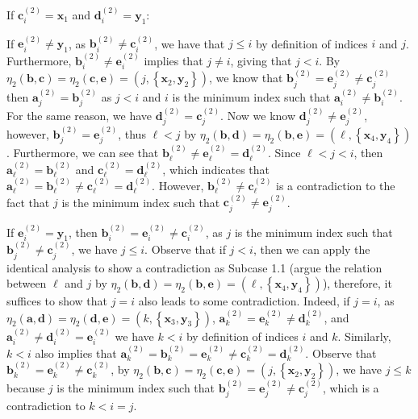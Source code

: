 \documentclass[11pt]{article}
\theoremstyle{definition}
\newcommand{\aaa}{\boldsymbol{a}}
\newcommand{\bb}{\boldsymbol{b}}
\newcommand{\cc}{\boldsymbol{c}}
\newcommand{\dd}{\boldsymbol{d}}
\newcommand{\ee}{\boldsymbol{e}}
\begin{document}
\begin{Case}
    \item If $\cc_{i}^{(2)}=\boldsymbol{x}_{1}$ and $\dd_{i}^{(2)}=\boldsymbol{y}_{1}$:  
    \begin{Case}
        \item If $\ee_{i}^{(2)}\neq \boldsymbol{y}_{1}$, as $\bb_{i}^{(2)}\neq \cc_{i}^{(2)}$, we have that $j\le i$ by definition of indices $i$ and $j$. Furthermore, $\bb_{i}^{(2)}\neq \ee_{i}^{(2)}$ implies that $j\neq i$, giving that $j<i$. By $\eta_{2}(\bb,\cc)=\eta_{2}(\cc,\ee)=(j,\left\{\boldsymbol{x}_{2},\boldsymbol{y}_{2}\right\})$, we know that $\bb_{j}^{(2)}=\ee_{j}^{(2)}\neq\cc_{j}^{(2)}$ then $\boldsymbol{a}_{j}^{(2)}=\bb_{j}^{(2)}$ as $j<i$ and $i$ is the minimum index such that $\boldsymbol{a}_{i}^{(2)}\neq\bb_{i}^{(2)}$. For the same reason, we have $\dd_{j}^{(2)}=\boldsymbol{c}_{j}^{(2)}$. Now we know $\dd_{j}^{(2)}\neq\ee_{j}^{(2)}$, however, $\bb_{j}^{(2)}=\ee_{j}^{(2)}$, thus $\ell<j$ by $\eta_{2}(\bb,\dd)=\eta_{2}(\bb,\ee)=(\ell,\left\{\boldsymbol{x}_{4},\boldsymbol{y}_{4}\right\})$. Furthermore,  we can see that $\bb_{\ell}^{(2)}\neq \ee_{\ell}^{(2)}=\dd_{\ell}^{(2)}$. Since $\ell<j<i$, then $\aaa_{\ell}^{(2)}=\bb_{\ell}^{(2)}$ and $\boldsymbol{c}_{\ell}^{(2)}=\dd_{\ell}^{(2)}$, which indicates that $\aaa_{\ell}^{(2)}=\bb_{\ell}^{(2)}\neq\boldsymbol{c}_{\ell}^{(2)}=\dd_{\ell}^{(2)}$. However, $\bb_{\ell}^{(2)}\neq\cc_{\ell}^{(2)}$ is a contradiction to the fact that $j$ is the minimum index such that $\boldsymbol{c}_{j}^{(2)}\neq\ee_{j}^{(2)}$.

        
        \item If $\ee_{i}^{(2)}=\boldsymbol{y}_{1}$, then $\bb_{i}^{(2)}=\ee_{i}^{(2)}\neq\cc_{i}^{(2)}$, as $j$ is the minimum index such that $\bb_{j}^{(2)}\neq\cc_{j}^{(2)}$, we have $j\le i$. Observe that if $j<i$, then we can apply the identical analysis to show a contradiction as Subcase 1.1 (argue the relation between $\ell$ and $j$ by $\eta_{2}(\bb,\dd)=\eta_{2}(\bb,\ee)=(\ell,\left\{\boldsymbol{x}_{4},\boldsymbol{y}_{4}\right\})$), therefore, it suffices to show that $j=i$ also leads to some contradiction. Indeed, if $j=i$, as $\eta_{2}(\aaa,\dd)=\eta_{2}(\dd,\ee)=(k,\left\{\boldsymbol{x}_{3},\boldsymbol{y}_{3}\right\})$, $\aaa_{k}^{(2)}=\ee_{k}^{(2)}\neq\dd_{k}^{(2)}$, and $\aaa_{i}^{(2)}\neq \dd_{i}^{(2)}= \ee_{i}^{(2)}$ we have $k<i$ by definition of indices $i$ and $k$. Similarly, $k<i$ also implies that $\aaa_{k}^{(2)}=\bb_{k}^{(2)}=\ee_{k}^{(2)}\neq \cc_{k}^{(2)}=\dd_{k}^{(2)}$. Observe that $\bb_{k}^{(2)}=\ee_{k}^{(2)}\neq\cc_{k}^{(2)}$, by $\eta_{2}(\bb,\cc)=\eta_{2}(\cc,\ee)=(j,\left\{\boldsymbol{x}_{2},\boldsymbol{y}_{2}\right\})$, we have $j\leq k$ because $j$ is the minimum index such that $\bb_{j}^{(2)}=\ee_{j}^{(2)}\neq\cc_{j}^{(2)}$, which is a contradiction to $k<i=j$.
    \end{Case}


\end{Case}
\end{document}
